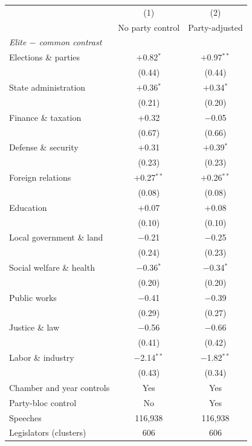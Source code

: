 \begin{tabular}{lcc}
\toprule
 & (1) & (2) \\
 & No party control & Party-adjusted \\
\midrule
\multicolumn{3}{l}{\textit{Elite $-$ common contrast}} \\
Elections \& parties & $+$0.82$^{*}$ & $+$0.97$^{**}$ \\
 & (0.44) & (0.44) \\
State administration & $+$0.36$^{*}$ & $+$0.34$^{*}$ \\
 & (0.21) & (0.20) \\
Finance \& taxation & $+$0.32 & $-$0.05 \\
 & (0.67) & (0.66) \\
Defense \& security & $+$0.31 & $+$0.39$^{*}$ \\
 & (0.23) & (0.23) \\
Foreign relations & $+$0.27$^{**}$ & $+$0.26$^{**}$ \\
 & (0.08) & (0.08) \\
Education & $+$0.07 & $+$0.08 \\
 & (0.10) & (0.10) \\
Local government \& land & $-$0.21 & $-$0.25 \\
 & (0.24) & (0.23) \\
Social welfare \& health & $-$0.36$^{*}$ & $-$0.34$^{*}$ \\
 & (0.20) & (0.20) \\
Public works & $-$0.41 & $-$0.39 \\
 & (0.29) & (0.27) \\
Justice \& law & $-$0.56 & $-$0.66 \\
 & (0.41) & (0.42) \\
Labor \& industry & $-$2.14$^{**}$ & $-$1.82$^{**}$ \\
 & (0.43) & (0.34) \\
\midrule
Chamber and year controls & Yes & Yes \\
Party-bloc control & No & Yes \\
Speeches & 116{,}938 & 116{,}938 \\
Legislators (clusters) & 606 & 606 \\
\bottomrule
\end{tabular}
